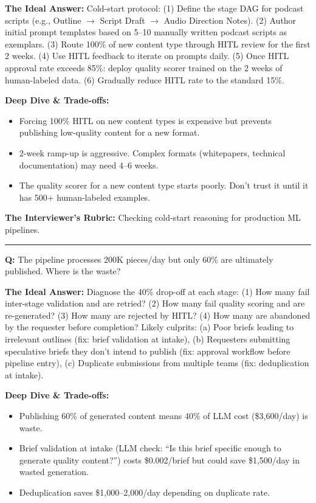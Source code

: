 \textbf{The Ideal Answer:} Cold-start protocol: (1) Define the stage DAG for podcast scripts (e.g., Outline $\rightarrow$ Script Draft $\rightarrow$ Audio Direction Notes). (2) Author initial prompt templates based on 5--10 manually written podcast scripts as exemplars. (3) Route 100\% of new content type through HITL review for the first 2 weeks. (4) Use HITL feedback to iterate on prompts daily. (5) Once HITL approval rate exceeds 85\%: deploy quality scorer trained on the 2 weeks of human-labeled data. (6) Gradually reduce HITL rate to the standard 15\%.

\textbf{Deep Dive \& Trade-offs:}
\begin{itemize}
  \item Forcing 100\% HITL on new content types is expensive but prevents publishing low-quality content for a new format.
  \item 2-week ramp-up is aggressive. Complex formats (whitepapers, technical documentation) may need 4--6 weeks.
  \item The quality scorer for a new content type starts poorly. Don't trust it until it has 500+ human-labeled examples.
\end{itemize}

\textbf{The Interviewer's Rubric:} Checking cold-start reasoning for production ML pipelines.

\bigskip\hrule\bigskip

\textbf{Q:} The pipeline processes 200K pieces/day but only 60\% are ultimately published. Where is the waste?

\textbf{The Ideal Answer:} Diagnose the 40\% drop-off at each stage: (1) How many fail inter-stage validation and are retried? (2) How many fail quality scoring and are re-generated? (3) How many are rejected by HITL? (4) How many are abandoned by the requester before completion? Likely culprits: (a) Poor briefs leading to irrelevant outlines (fix: brief validation at intake), (b) Requesters submitting speculative briefs they don't intend to publish (fix: approval workflow before pipeline entry), (c) Duplicate submissions from multiple teams (fix: deduplication at intake).

\textbf{Deep Dive \& Trade-offs:}
\begin{itemize}
  \item Publishing 60\% of generated content means 40\% of LLM cost (\$3,600/day) is waste.
  \item Brief validation at intake (LLM check: ``Is this brief specific enough to generate quality content?'') costs \$0.002/brief but could save \$1,500/day in wasted generation.
  \item Deduplication saves \$1,000--2,000/day depending on duplicate rate.
\end{itemize}

